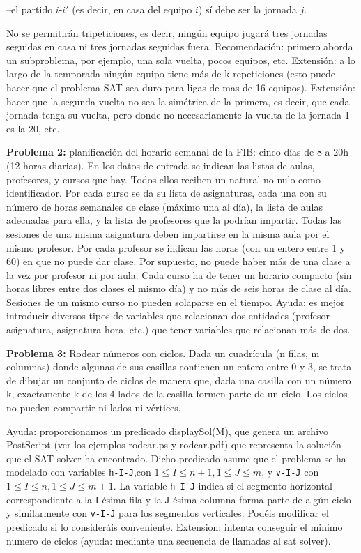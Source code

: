 \documentclass[11pt]{article}
\begin{document}
–el partido $i$-$i'$ (es decir, en casa del equipo $i$) sí debe ser la jornada $j$.

No se permitirán tripeticiones, es decir, ningún equipo jugará tres jornadas seguidas en casa ni tres
jornadas seguidas fuera. Recomendación: primero aborda un subproblema, por ejemplo, una sola
vuelta, pocos equipos, etc. Extensión: a lo largo de la temporada ningún equipo tiene
más de k repeticiones (esto puede hacer que el problema SAT sea duro para ligas de mas de 16
equipos). Extensión: hacer que la segunda vuelta no sea la simétrica
de la primera, es decir, que cada jornada tenga su vuelta, pero donde no necesariamente la vuelta
de la jornada 1 es la 20, etc. 
\medskip

\textbf{Problema 2:} planificación del horario semanal de la FIB: cinco días de 8 a 20h (12 horas diarias).
En los datos de entrada se indican las listas de aulas, profesores, y cursos que hay. Todos ellos
reciben un natural no nulo como identificador. Por cada curso se da su lista de asignaturas, cada
una con su número de horas semanales de clase (máximo una al día), la lista de aulas adecuadas para
ella, y la lista de profesores que la podrían impartir. Todas las sesiones de una misma asignatura
deben impartirse en la misma aula por el mismo profesor. Por cada profesor se indican las horas
(con un entero entre 1 y 60) en que no puede dar clase. Por supuesto, no puede haber más de una
clase a la vez por profesor ni por aula. Cada curso ha de tener un horario compacto (sin horas
libres entre dos clases el mismo día) y no más de seis horas de clase al día. Sesiones de un mismo
curso no pueden solaparse en el tiempo. Ayuda: es mejor introducir diversos tipos de variables que relacionan
dos entidades (profesor-asignatura, asignatura-hora, etc.) que tener variables que relacionan más de dos.
\medskip

\textbf{Problema 3:} Rodear números con ciclos. Dada un cuadrícula (n filas, m columnas) donde algunas
de sus casillas contienen un entero entre 0 y 3, se trata de dibujar un conjunto de ciclos de manera
que, dada una casilla con un número k, exactamente k de los 4 lados de la casilla formen parte de
un ciclo. Los ciclos no pueden compartir ni lados ni vértices.

Ayuda: proporcionamos un predicado displaySol(M), que genera un archivo PostScript (ver los ejemplos rodear.ps y rodear.pdf) que
representa la solución que el SAT solver ha encontrado. Dicho predicado asume que el problema
se ha modelado con variables \texttt{h-I-J},con $1 \leq I \leq n + 1, 1 \leq J \leq m$, y \texttt{v-I-J} con $1 \leq I \leq n,
1 \leq J \leq m+1$. La variable \texttt{h-I-J} indica si el segmento horizontal correspondiente a la I-ésima fila
y la J-ésima columna forma parte de algún ciclo y similarmente con \texttt{v-I-J} para los segmentos
verticales. Podéis modificar el predicado si lo consideráis conveniente.
Extension: intenta conseguir el minimo numero de ciclos (ayuda: mediante una secuencia de llamadas al sat solver).
\medskip
\end{document}
